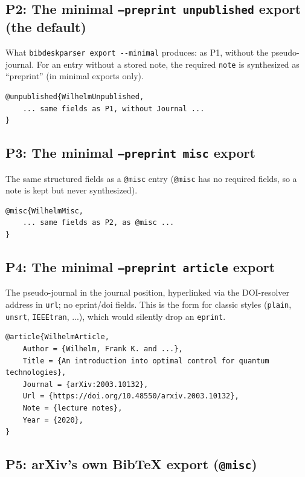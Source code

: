 \documentclass[onecolumn, amsmath, amssymb, aps, pra]{revtex4-2}
\begin{document}
\subsection{P2: The minimal \texttt{--preprint unpublished} export (the
default)~\cite{WilhelmUnpublished}}

What \verb|bibdeskparser export --minimal| produces: as P1, without the
pseudo-journal. For an entry without a stored note, the required
\texttt{note} is synthesized as ``preprint'' (in minimal exports only).

\begin{Verbatim}
@unpublished{WilhelmUnpublished,
    ... same fields as P1, without Journal ...
}
\end{Verbatim}

\subsection{P3: The minimal \texttt{--preprint misc}
export~\cite{WilhelmMisc}}

The same structured fields as a \texttt{@misc} entry (\texttt{@misc} has
no required fields, so a note is kept but never synthesized).

\begin{Verbatim}
@misc{WilhelmMisc,
    ... same fields as P2, as @misc ...
}
\end{Verbatim}

\subsection{P4: The minimal \texttt{--preprint article}
export~\cite{WilhelmArticle}}

The pseudo-journal in the journal position, hyperlinked via the
DOI-resolver address in \texttt{url}; no eprint/doi fields. This is the
form for classic styles (\texttt{plain}, \texttt{unsrt},
\texttt{IEEEtran}, ...), which would silently drop an \texttt{eprint}.

\begin{Verbatim}
@article{WilhelmArticle,
    Author = {Wilhelm, Frank K. and ...},
    Title = {An introduction into optimal control for quantum technologies},
    Journal = {arXiv:2003.10132},
    Url = {https://doi.org/10.48550/arxiv.2003.10132},
    Note = {lecture notes},
    Year = {2020},
}
\end{Verbatim}

\subsection{P5: arXiv's own BibTeX export
(\texttt{@misc})~\cite{WilhelmArxivExport}}
\end{document}
